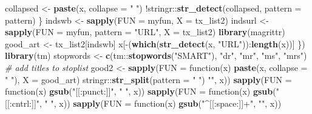\documentclass[12pt,]{article}
\newenvironment{Shaded}{\begin{snugshade}}{\end{snugshade}}
\newcommand{\KeywordTok}[1]{\textcolor[rgb]{0.13,0.29,0.53}{\textbf{{#1}}}}
\newcommand{\DataTypeTok}[1]{\textcolor[rgb]{0.13,0.29,0.53}{{#1}}}
\newcommand{\StringTok}[1]{\textcolor[rgb]{0.31,0.60,0.02}{{#1}}}
\newcommand{\CommentTok}[1]{\textcolor[rgb]{0.56,0.35,0.01}{\textit{{#1}}}}
\newcommand{\NormalTok}[1]{{#1}}
\begin{document}
\begin{Shaded}
\begin{Highlighting}[]
    \NormalTok{collapsed <-}\StringTok{ }\KeywordTok{paste}\NormalTok{(x, }\DataTypeTok{collapse =} \StringTok{" "}\NormalTok{)}
    \NormalTok{!stringr::}\KeywordTok{str_detect}\NormalTok{(collapsed, }\DataTypeTok{pattern =} \NormalTok{pattern)}
\NormalTok{\}}
\NormalTok{indswb <-}\StringTok{ }\KeywordTok{sapply}\NormalTok{(}\DataTypeTok{FUN =} \NormalTok{myfun, }\DataTypeTok{X =} \NormalTok{tx_list2)}
\NormalTok{indsurl <-}\StringTok{ }\KeywordTok{sapply}\NormalTok{(}\DataTypeTok{FUN =} \NormalTok{myfun, }\DataTypeTok{pattern =} \StringTok{"URL"}\NormalTok{, }\DataTypeTok{X =} \NormalTok{tx_list2)}
\KeywordTok{library}\NormalTok{(magrittr)}
\NormalTok{good_art <-}\StringTok{ }\NormalTok{tx_list2[indswb] %
    \NormalTok{x[-(}\KeywordTok{which}\NormalTok{(}\KeywordTok{str_detect}\NormalTok{(x, }\StringTok{"URL"}\NormalTok{)):}\KeywordTok{length}\NormalTok{(x))]}
\NormalTok{\})}
\KeywordTok{library}\NormalTok{(tm)}
\NormalTok{stopwords <-}\StringTok{ }\KeywordTok{c}\NormalTok{(tm::}\KeywordTok{stopwords}\NormalTok{(}\StringTok{"SMART"}\NormalTok{), }\StringTok{"dr"}\NormalTok{, }\StringTok{"mr"}\NormalTok{, }\StringTok{"ms"}\NormalTok{, }\StringTok{"mrs"}\NormalTok{)  }\CommentTok{# add titles to stoplist}
\NormalTok{good2 <-}\StringTok{ }\KeywordTok{sapply}\NormalTok{(}\DataTypeTok{FUN =} \NormalTok{function(x) }\KeywordTok{paste}\NormalTok{(x, }\DataTypeTok{collapse =} \StringTok{" "}\NormalTok{), }\DataTypeTok{X =} \NormalTok{good_art) %
\StringTok{    }\NormalTok{stringr::}\KeywordTok{str_split}\NormalTok{(}\DataTypeTok{pattern =} \StringTok{" "}\NormalTok{) %
    \StringTok{""}\NormalTok{, x)) %
\KeywordTok{sapply}\NormalTok{(}\DataTypeTok{FUN =} \NormalTok{function(x) }\KeywordTok{gsub}\NormalTok{(}\StringTok{"[[:punct:]]"}\NormalTok{, }\StringTok{" "}\NormalTok{, x)) %
\KeywordTok{sapply}\NormalTok{(}\DataTypeTok{FUN =} \NormalTok{function(x) }\KeywordTok{gsub}\NormalTok{(}\StringTok{"[[:cntrl:]]"}\NormalTok{, }\StringTok{" "}\NormalTok{, x)) %
\KeywordTok{sapply}\NormalTok{(}\DataTypeTok{FUN =} \NormalTok{function(x) }\KeywordTok{gsub}\NormalTok{(}\StringTok{"^[[:space:]]+"}\NormalTok{, }\StringTok{""}\NormalTok{, x)) %
}}}}}}}
\end{Highlighting}
\end{Shaded}
\end{document}
